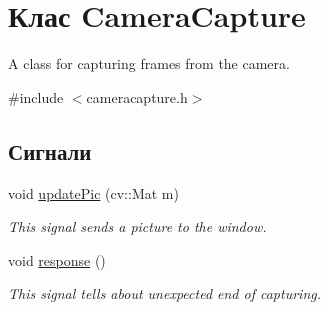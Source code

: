 \hypertarget{classCameraCapture}{\section{Клас Camera\-Capture}
\label{classCameraCapture}
}


A class for capturing frames from the camera.  




{\ttfamily \#include $<$cameracapture.\-h$>$}

\subsection*{Сигнали}
\begin{DoxyCompactItemize}
\item 
\hypertarget{classCameraCapture_a4d5f58489a06c0f2dc17da937701849e}{void \hyperlink{classCameraCapture_a4d5f58489a06c0f2dc17da937701849e}{update\-Pic} (cv\-::\-Mat m)}\label{classCameraCapture_a4d5f58489a06c0f2dc17da937701849e}

\begin{DoxyCompactList}\small\item\em This signal sends a picture to the window. \end{DoxyCompactList}\item 
\hypertarget{classCameraCapture_a0626cba6e42bc84228d96fbb959fffe1}{void \hyperlink{classCameraCapture_a0626cba6e42bc84228d96fbb959fffe1}{response} ()}\label{classCameraCapture_a0626cba6e42bc84228d96fbb959fffe1}

\begin{DoxyCompactList}\small\item\em This signal tells about unexpected end of capturing. \end{DoxyCompactList}\end{DoxyCompactItemize}
